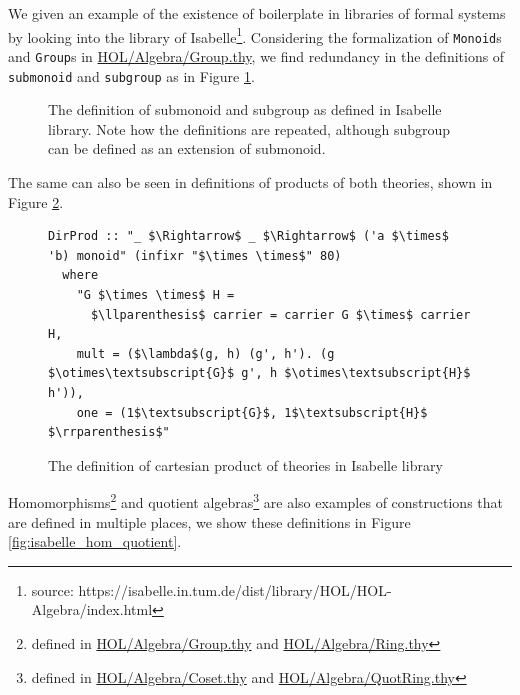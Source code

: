 We given an example of the existence of boilerplate in libraries of formal systems by looking into the 
library of Isabelle\footnote{source: https://isabelle.in.tum.de/dist/library/HOL/HOL-Algebra/index.html}. 
Considering the formalization of 
\verb|Monoid|s and \verb|Group|s in \url{HOL/Algebra/Group.thy}, we find redundancy in the 
definitions of \verb|submonoid| and \verb|subgroup| as in Figure \ref{fig:isabelle_subalg}.  \newline 

\begin{figure}



\caption{The definition of submonoid and subgroup as defined in Isabelle library. Note how the 
definitions are repeated, although subgroup can be defined as an extension of submonoid.}
\label{fig:isabelle_subalg}
\end{figure}
The same can also be seen in definitions of products of both theories, shown in Figure 
\ref{fig:isabelle_prod}. 
\begin{figure}
	\begin{lstlisting}
DirProd :: "_ $\Rightarrow$ _ $\Rightarrow$ ('a $\times$ 'b) monoid" (infixr "$\times \times$" 80) 
  where
	"G $\times \times$ H =
      $\llparenthesis$ carrier = carrier G $\times$ carrier H,
	mult = ($\lambda$(g, h) (g', h'). (g $\otimes\textsubscript{G}$ g', h $\otimes\textsubscript{H}$ h')),
	one = (1$\textsubscript{G}$, 1$\textsubscript{H}$ $\rrparenthesis$"
	\end{lstlisting}
	
	
	
	\caption{The definition of cartesian product of theories in Isabelle library}
	\label{fig:isabelle_prod}
\end{figure}
Homomorphisms\footnote{defined in \url{HOL/Algebra/Group.thy} and \url{HOL/Algebra/Ring.thy}} 
and quotient algebras\footnote{defined in \url{HOL/Algebra/Coset.thy} and 
\url{HOL/Algebra/QuotRing.thy}} are also 
examples of constructions that are defined in multiple 
places, we show these definitions in Figure \ref{fig:isabelle_hom_quotient}. 
